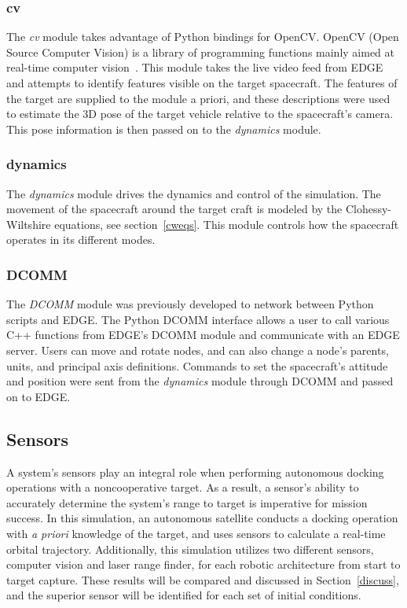 \documentclass[journal, 10pt]{IEEEtran}
\begin{document}
\subsubsection{cv}
The \textit{cv} module takes advantage of Python bindings for OpenCV. OpenCV (Open Source Computer Vision) is a library of programming functions mainly aimed at real-time computer vision~\cite{opencv}. This module takes the live video feed from EDGE and attempts to identify features visible on the target spacecraft. The features of the target are supplied to the module a priori, and these descriptions were used to estimate the 3D pose of the target vehicle relative to the spacecraft's camera. This pose information is then passed on to the \textit{dynamics} module.

\subsubsection{dynamics}
The \textit{dynamics} module drives the dynamics and control of the simulation. The movement of the spacecraft around the target craft is modeled by the Clohessy-Wiltshire equations, see section~\ref{cweqs}. This module controls how the spacecraft operates in its different modes.

\subsubsection{DCOMM}
The \textit{DCOMM} module was previously developed to network between Python scripts and EDGE. The Python DCOMM interface allows a user to call various C++ functions from EDGE's DCOMM module and communicate with an EDGE server. Users can move and rotate nodes, and can also change a node's parents, units, and principal axis definitions. Commands to set the spacecraft's attitude and position were sent from the \textit{dynamics} module through DCOMM and passed on to EDGE.

\subsection{Sensors}
A system's sensors play an integral role when performing autonomous docking operations with a noncooperative target. As a result, a sensor's ability to accurately determine the system's range to target is imperative for mission success. In this simulation, an autonomous satellite conducts a docking operation with \textit{a priori} knowledge of the target, and uses sensors to calculate a real-time orbital trajectory. Additionally, this simulation utilizes two different sensors, computer vision and laser range finder, for each robotic architecture from start to target capture. These results will be compared and discussed in Section~\ref{discuss}, and the superior sensor will be identified for each set of initial conditions.
\end{document}
